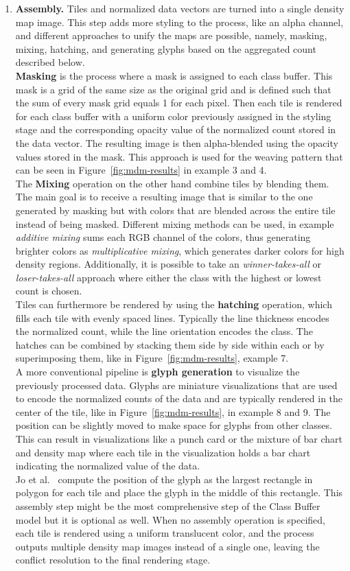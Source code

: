 \begin{enumerate}[leftmargin=*]
	\item \textbf{Assembly.} Tiles and normalized data vectors are turned into a single density map image. This step adds more styling to the process, like an alpha channel, and different approaches to unify the maps are possible, namely, masking, mixing, hatching, and generating glyphs based on the aggregated count described below.\\\textbf{Masking} is the process where a mask is assigned to each class buffer. This mask is a grid of the same size as the original grid and is defined such that the sum of every mask grid equals 1 for each pixel. Then each tile is rendered for each class buffer with a uniform color previously assigned in the styling stage and the corresponding opacity value of the normalized count stored in the data vector. The resulting image is then alpha-blended using the opacity values stored in the mask. This approach is used for the weaving pattern that can be seen in Figure~\ref{fig:mdm-results} in example 3 and 4.\\The \textbf{Mixing} operation on the other hand combine tiles by blending them. The main goal is to receive a resulting image that is similar to the one generated by masking but with colors that are blended across the entire tile instead of being masked. Different mixing methods can be used, in example \textit{additive mixing} sums each RGB channel of the colors, thus generating brighter colors as \textit{multiplicative mixing}, which generates darker colors for high density regions. Additionally, it is possible to take an \textit{winner-takes-all} or \textit{loser-takes-all} approach where either the class with the highest or lowest count is chosen.\\Tiles can furthermore be rendered by using the \textbf{hatching} operation, which fills each tile with evenly spaced lines. Typically the line thickness encodes the normalized count, while the line orientation encodes the class. The hatches can be combined by stacking them side by side within each or by superimposing them, like in Figure~\ref{fig:mdm-results}, example 7.\\A more conventional pipeline is \textbf{glyph generation} to visualize the previously processed data. Glyphs are miniature visualizations that are used to encode the normalized counts of the data and are typically rendered in the center of the tile, like in Figure~\ref{fig:mdm-results}, in example 8 and 9. The position can be slightly moved to make space for glyphs from other classes. This can result in visualizations like a punch card or the mixture of bar chart and density map where each tile in the visualization holds a bar chart indicating the normalized value of the data.\\Jo et al.~\cite{jo2019declarative} compute the position of the glyph as the largest rectangle in polygon for each tile and place the glyph in the middle of this rectangle. This assembly step might be the most comprehensive step of the Class Buffer model but it is optional as well. When no assembly operation is specified, each tile is rendered using a uniform translucent color, and the process outputs multiple density map images instead of a single one, leaving the conflict resolution to the final rendering stage.

\end{enumerate}
